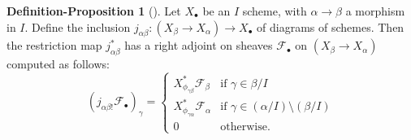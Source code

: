 \documentclass[proquest]{uwthesis}[2014/11/13]
\theoremstyle{definition}
\newtheorem{defprop}[theorem]{Definition-Proposition}
\newcommand{\FF}{\mathscr{F}}
\begin{document}
\begin{defprop}[{\cite[II 6.7]{Lipman2009}}]
	Let $X_\bullet$ be an $I$ scheme, with $\alpha \rightarrow \beta$ a morphism in $I$.
	Define the inclusion $j_{\alpha \beta} : (X_\beta \rightarrow X_\alpha) \rightarrow X_\bullet$ of diagrams of schemes.
	Then the restriction map $j_{\alpha \beta}^*$ has a right adjoint on sheaves $\FF_\bullet$ on $(X_\beta \rightarrow X_\alpha)$ computed as follows:
	\[
		(j_{\alpha \beta !} \FF_\bullet)_\gamma = \begin{cases}
								X_{\phi_{\gamma \beta}}^* \FF_\beta &\text{if } \gamma \in \beta / I \\
								X_{\phi_{\gamma \alpha}}^* \FF_\alpha &\text{if } \gamma \in (\alpha / I) \setminus (\beta / I) \\
								0 &\text{otherwise.}
		\end{cases}
	\]
\end{defprop}
\end{document}

